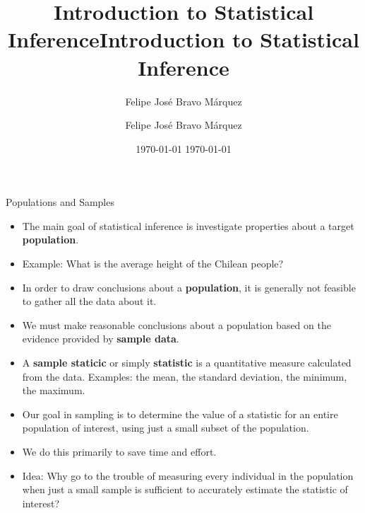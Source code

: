 \documentclass[handout]{beamer}
\title{Introduction to Statistical Inference}
\author[Felipe Bravo Márquez]{\footnotesize
 \textcolor[rgb]{0.00,0.00,1.00}{Felipe José Bravo Márquez}}
\date{ \today }
\title{Introduction to Statistical Inference}
\author[Felipe Bravo Márquez]{\footnotesize
 \textcolor[rgb]{0.00,0.00,1.00}{Felipe José Bravo Márquez}}
\date{ \today }
\begin{document}
\begin{frame}
\titlepage


\end{frame}




\begin{frame}{Populations and Samples}
\scriptsize{
\begin{itemize}
 \item The main goal of statistical inference is investigate properties about a target \textbf{population}.
 \item Example: What is the average height of the Chilean people? 
  \item In order to draw conclusions about a \textbf{population}, it is generally not feasible to gather all the data about it.
 \item We must make reasonable conclusions about a population based on the evidence provided by \textbf{sample data}.

 \item A \textbf{sample staticic} or simply \textbf{statistic} is a quantitative measure calculated from the data. Examples: the mean, the standard deviation, the minimum, the maximum.
 
 
 \item Our goal in sampling is to determine the value of a statistic for an entire population of interest, using just a small subset of the population.
 
 \item We do this primarily to save time and effort.
 
 \item Idea: Why go to the trouble of measuring every individual in the population when just a small sample is sufficient to accurately estimate the statistic of interest? \cite{poldrack2019statistical}
 
 

\end{itemize}

} 
\end{frame}
\end{document}
